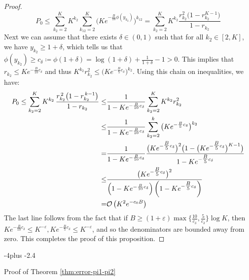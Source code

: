 \documentclass[numsec,webpdf,modern,medium,namedate]{oup-authoring-template}
\makeatletter
\theoremstyle{thmstyleone}%
\theoremstyle{thmstyletwo}%
\theoremstyle{thmstylethree}%
\def\subsection{%
  \@startsection{subsection}{2}{\z@}
  {-4\p@ plus -2\p@}{\if@traditional.4\p@\else2\p@\fi}
  {\reset@font\raggedright\subsecsize}}
\makeatother
\begin{document}
\begin{proof}
$$
P_0 \leq \sum_{k_2=2}^{K}K^{k_2}\sum_{k_{12}=2}^{K}
\Big(Ke^{-\frac{B}{10}\phi(y_{k_2})}\Big)^{k_{12}}
=\sum_{k_2=2}^{K}K^{k_2}
\frac{r_{k_2}^{2}\big(1-r_{k_2}^{K-1}\big)}{1-r_{k_2}}
$$
Next we can assume that there exists $\delta \in (0,1)$ such that for all $k_2 \in [2,K]$, we have $y_{k_2} \geq 1 + \delta$, which tells us that $\phi(y_{k_2})\ge c_\delta\coloneqq \phi(1+\delta)
=\log(1+\delta)+\frac{1}{1+\delta}-1>0$. This implies that $r_{k_2}\leq K e^{-\frac{B}{10}c_\delta}$ and thus $K^{k_2}r_{k_2}^2\leq \big(Ke^{-\frac{B}{5}c_\delta}\big)^{k_2}$. Using this chain on inequalities, we have:
\begin{equation}
    \begin{split}
        P_0 \leq  \sum_{k_2=2}^{K}K^{k_2}\,
        \frac{r_{k_2}^{\,2}\big(1-r_{k_2}^{\,k-1}\big)}{1-r_{k_2}}
        \leq & \dfrac{1}{1 - Ke^{-\frac{B}{10}c_\delta}}\sum_{k_2=2}^K K^{k_2}r_{k_2}^2\\ 
        \leq & \dfrac{1}{1 - Ke^{-\frac{B}{10}c_\delta}}\sum_{k_2=2}^k \big(Ke^{-\frac{B}{5}c_\delta}\big)^{k_2}\\
        = & \dfrac{1}{1 - Ke^{-\frac{B}{10}c_\delta}}\frac{\big(Ke^{-\tfrac{B}{5}c_\delta}\big)^2\big(1-\big(Ke^{-\tfrac{B}{5}c_\delta}\big)^{K-1}\big)}
        {1-Ke^{-\tfrac{B}{5}c_\delta}}\\
        \leq &  \dfrac{\big(Ke^{-\tfrac{B}{5}c_\delta}\big)^2}{\left(1 - Ke^{-\frac{B}{10}c_\delta}\right)\left(1-Ke^{-\tfrac{B}{5}c_\delta}\right)}\\
        = & \mathcal{O}\left(K^2 e^{-c_0 B}\right)
    \end{split}
\end{equation}
The last line follows from the fact that if
$B\geq(1+\varepsilon)\max\!\Big\{\frac{10}{c_\delta},\frac{5}{c_\delta}\Big\}\log K$, then $Ke^{-\frac{B}{10}c_\delta}\leq K^{-\varepsilon}, Ke^{-\frac{B}{5}c_\delta}\leq K^{-\varepsilon}$, and so the denominators are bounded away from zero. This completes the proof of this proposition.
\end{proof}


\subsection{Proof of Theorem \ref{thm:error-pi1-pi2}}\label{thm:error-pi1-pi2-proof}
\end{document}
